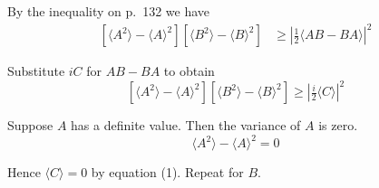 


\bigskip
By the inequality on p.~132 we have
\begin{align*}
\left[\langle A^2\rangle-\langle A\rangle^2\right]
\left[\langle B^2\rangle-\langle B\rangle^2\right]
&\ge\left|\tfrac{1}{2}\langle AB-BA\rangle\right|^2
\end{align*}

Substitute $iC$ for $AB-BA$ to obtain
\begin{equation*}
\left[\langle A^2\rangle-\langle A\rangle^2\right]
\left[\langle B^2\rangle-\langle B\rangle^2\right]
\ge\left|\tfrac{i}{2}\langle C\rangle\right|^2\tag{1}
\end{equation*}

Suppose $A$ has a definite value. Then the variance of $A$ is zero.
\begin{equation*}
\langle A^2\rangle-\langle A\rangle^2=0
\end{equation*}

Hence $\langle C\rangle=0$ by equation (1). Repeat for $B$.


